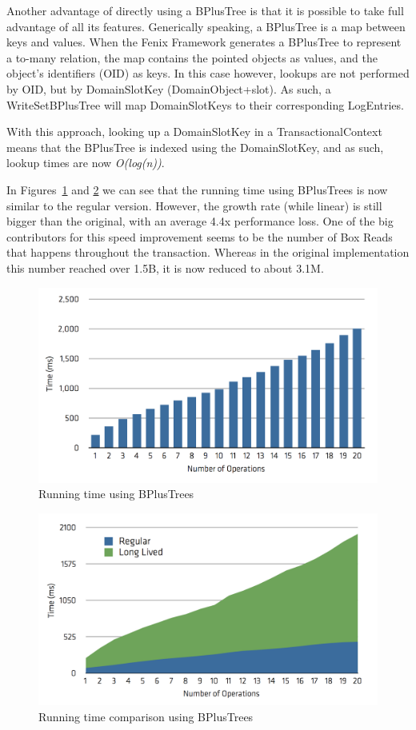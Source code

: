 Another advantage of directly using a BPlusTree is that it is possible
to take full advantage of all its features. Generically speaking, a
BPlusTree is a map between keys and values. When the Fenix Framework
generates a BPlusTree to represent a to-many relation, the map
contains the pointed objects as values, and the object's identifiers
(OID) as keys. In this case however, lookups are not performed by OID,
but by DomainSlotKey (DomainObject+slot). As such, a WriteSetBPlusTree
will map DomainSlotKeys to their corresponding LogEntries.

With this approach, looking up a DomainSlotKey in a
TransactionalContext means that the BPlusTree is indexed using the
DomainSlotKey, and as such, lookup times are now {\it O(log(n))}.

In Figures~\ref{fig:runtimeBPlus} and \ref{fig:comparisonBPlus} we can
see that the running time using BPlusTrees is now similar to the
regular version. However, the growth rate (while linear) is still
bigger than the original, with an average 4.4x performance loss. One
of the big contributors for this speed improvement seems to be the
number of Box Reads that happens throughout the transaction. Whereas
in the original implementation this number reached over 1.5B, it is
now reduced to about 3.1M.

\begin{figure}
\centering
\includegraphics[width=0.9\linewidth]{time-long-bplus}
\caption{Running time using BPlusTrees}
\label{fig:runtimeBPlus}
\end{figure}

\begin{figure}
\centering
\includegraphics[width=0.9\linewidth]{comparison-bplus}
\caption{Running time comparison using BPlusTrees}
\label{fig:comparisonBPlus}
\end{figure}


